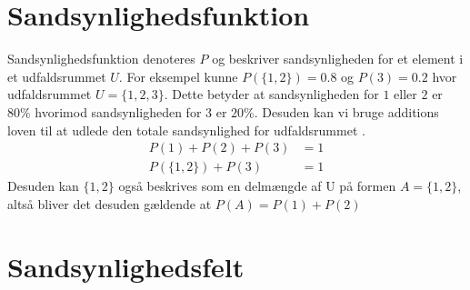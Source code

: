 \documentclass[../../SRP.tex]{subfiles}
\begin{document}
\begin{center}
\qquad
\end{center}
\section{Sandsynlighedsfunktion}

Sandsynlighedsfunktion denoteres $P$ og beskriver sandsynligheden for et element i et udfaldsrummet $U$. For eksempel kunne $P(\{1,2\}) = 0.8$ og $P(3) = 0.2$ hvor udfaldsrummet $U = \{1,2,3\}$. Dette betyder at sandsynligheden for $1$ eller $2$ er $80\%$ hvorimod sandsynligheden for $3$ er $20\%$. Desuden kan vi bruge additions loven til at udlede den totale sandsynlighed for udfaldsrummet \cite{SC}.
\begin{align}
  P(1) + P(2) + P(3) &= 1 \\
  P(\{1,2\}) + P(3) &= 1
\end{align}
Desuden kan $\{1,2\}$ også beskrives som en delmængde af U på formen $A = \{1,2\}$, altså bliver det desuden gældende at $P(A) = P(1) + P(2)$

\section{Sandsynlighedsfelt}
\end{document}
